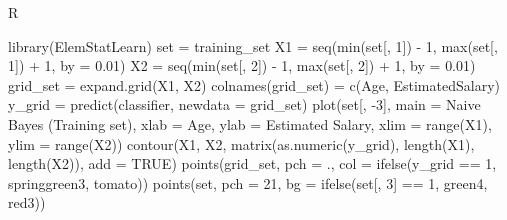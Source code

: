 \documentclass[
]{book}
\newenvironment{Shaded}{\begin{snugshade}}{\end{snugshade}}
\newcommand{\AttributeTok}[1]{\textcolor[rgb]{0.77,0.63,0.00}{#1}}
\newcommand{\ConstantTok}[1]{\textcolor[rgb]{0.00,0.00,0.00}{#1}}
\newcommand{\DecValTok}[1]{\textcolor[rgb]{0.00,0.00,0.81}{#1}}
\newcommand{\FloatTok}[1]{\textcolor[rgb]{0.00,0.00,0.81}{#1}}
\newcommand{\FunctionTok}[1]{\textcolor[rgb]{0.00,0.00,0.00}{#1}}
\newcommand{\NormalTok}[1]{#1}
\newcommand{\OtherTok}[1]{\textcolor[rgb]{0.56,0.35,0.01}{#1}}
\newcommand{\SpecialCharTok}[1]{\textcolor[rgb]{0.00,0.00,0.00}{#1}}
\newcommand{\StringTok}[1]{\textcolor[rgb]{0.31,0.60,0.02}{#1}}
\theoremstyle{definition}
\theoremstyle{definition}
\theoremstyle{definition}
\theoremstyle{definition}
\theoremstyle{remark}
\begin{document}
R

\begin{Shaded}
\begin{Highlighting}[]
\FunctionTok{library}\NormalTok{(ElemStatLearn)}
\NormalTok{set }\OtherTok{=}\NormalTok{ training\_set}
\NormalTok{X1 }\OtherTok{=} \FunctionTok{seq}\NormalTok{(}\FunctionTok{min}\NormalTok{(set[, }\DecValTok{1}\NormalTok{]) }\SpecialCharTok{{-}} \DecValTok{1}\NormalTok{, }\FunctionTok{max}\NormalTok{(set[, }\DecValTok{1}\NormalTok{]) }\SpecialCharTok{+} \DecValTok{1}\NormalTok{, }\AttributeTok{by =} \FloatTok{0.01}\NormalTok{)}
\NormalTok{X2 }\OtherTok{=} \FunctionTok{seq}\NormalTok{(}\FunctionTok{min}\NormalTok{(set[, }\DecValTok{2}\NormalTok{]) }\SpecialCharTok{{-}} \DecValTok{1}\NormalTok{, }\FunctionTok{max}\NormalTok{(set[, }\DecValTok{2}\NormalTok{]) }\SpecialCharTok{+} \DecValTok{1}\NormalTok{, }\AttributeTok{by =} \FloatTok{0.01}\NormalTok{)}
\NormalTok{grid\_set }\OtherTok{=} \FunctionTok{expand.grid}\NormalTok{(X1, X2)}
\FunctionTok{colnames}\NormalTok{(grid\_set) }\OtherTok{=} \FunctionTok{c}\NormalTok{(}\StringTok{\textquotesingle{}Age\textquotesingle{}}\NormalTok{, }\StringTok{\textquotesingle{}EstimatedSalary\textquotesingle{}}\NormalTok{)}
\NormalTok{y\_grid }\OtherTok{=} \FunctionTok{predict}\NormalTok{(classifier, }\AttributeTok{newdata =}\NormalTok{ grid\_set)}
\FunctionTok{plot}\NormalTok{(set[, }\SpecialCharTok{{-}}\DecValTok{3}\NormalTok{],}
     \AttributeTok{main =} \StringTok{\textquotesingle{}Naive Bayes (Training set)\textquotesingle{}}\NormalTok{,}
     \AttributeTok{xlab =} \StringTok{\textquotesingle{}Age\textquotesingle{}}\NormalTok{, }\AttributeTok{ylab =} \StringTok{\textquotesingle{}Estimated Salary\textquotesingle{}}\NormalTok{,}
     \AttributeTok{xlim =} \FunctionTok{range}\NormalTok{(X1), }\AttributeTok{ylim =} \FunctionTok{range}\NormalTok{(X2))}
\FunctionTok{contour}\NormalTok{(X1, X2, }\FunctionTok{matrix}\NormalTok{(}\FunctionTok{as.numeric}\NormalTok{(y\_grid), }\FunctionTok{length}\NormalTok{(X1), }\FunctionTok{length}\NormalTok{(X2)), }\AttributeTok{add =} \ConstantTok{TRUE}\NormalTok{)}
\FunctionTok{points}\NormalTok{(grid\_set, }\AttributeTok{pch =} \StringTok{\textquotesingle{}.\textquotesingle{}}\NormalTok{, }\AttributeTok{col =} \FunctionTok{ifelse}\NormalTok{(y\_grid }\SpecialCharTok{==} \DecValTok{1}\NormalTok{, }\StringTok{\textquotesingle{}springgreen3\textquotesingle{}}\NormalTok{, }\StringTok{\textquotesingle{}tomato\textquotesingle{}}\NormalTok{))}
\FunctionTok{points}\NormalTok{(set, }\AttributeTok{pch =} \DecValTok{21}\NormalTok{, }\AttributeTok{bg =} \FunctionTok{ifelse}\NormalTok{(set[, }\DecValTok{3}\NormalTok{] }\SpecialCharTok{==} \DecValTok{1}\NormalTok{, }\StringTok{\textquotesingle{}green4\textquotesingle{}}\NormalTok{, }\StringTok{\textquotesingle{}red3\textquotesingle{}}\NormalTok{))}
\end{Highlighting}
\end{Shaded}
\end{document}
